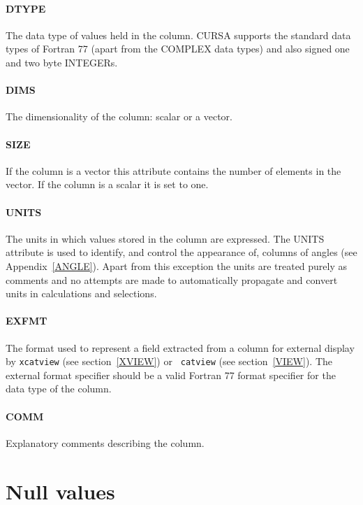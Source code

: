 \documentclass[twoside,11pt]{article}
\newcommand{\xlabel}[1]{}
\renewcommand{\_}{\texttt{\symbol{95}}}
\begin{document}
\paragraph{DTYPE}
The data type of values held in the column. CURSA supports the
standard data types of Fortran 77 (apart from the COMPLEX data types)
and also signed one and two byte INTEGERs.

\paragraph{DIMS}
The dimensionality of the column: scalar or a vector.

\paragraph{SIZE} 
If the column is a vector this attribute contains the number of 
elements in the vector. If the column is a scalar it is set to one.

\paragraph{UNITS}
The units in which values stored in the column are expressed. The UNITS
attribute is used to identify, and control the appearance of, columns
of angles (see Appendix~\ref{ANGLE}). Apart from this exception the units
are treated purely as comments and no attempts are made to automatically 
propagate and convert units in calculations and selections. 

\paragraph{EXFMT} 
The format used to represent a field extracted from a column for 
external display by {\tt xcatview} (see section~\ref{XVIEW}) or {\tt 
catview} (see section~\ref{VIEW}). The external format specifier should be 
a valid Fortran 77 format specifier for the data type of the column.

\paragraph{COMM}
Explanatory comments describing the column.


\section{\xlabel{NULLS}\label{NULLS}Null values}
\end{document}
